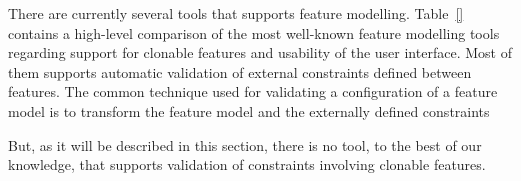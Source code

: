 
There are currently several tools that supports feature modelling. Table~\ref{} contains a high-level comparison of the most well-known feature modelling tools regarding support for clonable features and usability of the user interface. Most of them supports automatic validation of external constraints defined between features. The common technique used for validating a configuration of a feature model is to transform the feature model and the externally defined constraints


But, as it will be described in this section, there is no tool, to the best of our knowledge, that supports validation of constraints involving clonable features.



